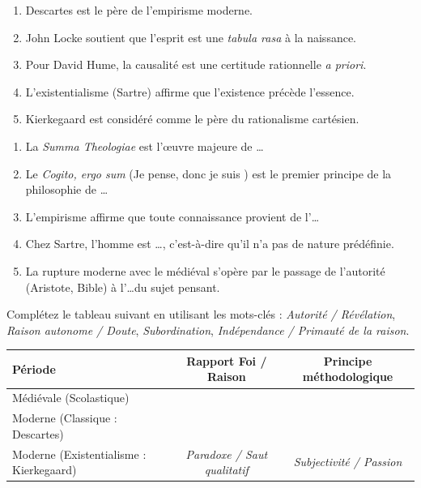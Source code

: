 \documentclass[11pt]{article}
\begin{document}
\begin{exercice}
\begin{enumerate}
    \item Descartes est le père de l'empirisme moderne.
    \item John Locke soutient que l'esprit est une \textit{tabula rasa} à la naissance.
    \item Pour David Hume, la causalité est une certitude rationnelle \textit{a priori}.
    \item L'existentialisme (Sartre) affirme que l'existence précède l'essence.
    \item Kierkegaard est considéré comme le père du rationalisme cartésien.
\end{enumerate}
\end{exercice}

\begin{exercice}
\begin{enumerate}
    \item La \textit{Summa Theologiae} est l'œuvre majeure de \dots
    \item Le \textit{Cogito, ergo sum} (\og Je pense, donc je suis \fg) est le premier principe de la philosophie de \dots
    \item L'empirisme affirme que toute connaissance provient de l'\dots
    \item Chez Sartre, l'homme est \dots, c'est-à-dire qu'il n'a pas de nature prédéfinie.
    \item La rupture moderne avec le médiéval s'opère par le passage de l'autorité (Aristote, Bible) à l'\dots du sujet pensant.
\end{enumerate}
\end{exercice}

\begin{exercice}
Complétez le tableau suivant en utilisant les mots-clés : \textit{Autorité / Révélation}, \textit{Raison autonome / Doute}, \textit{Subordination}, \textit{Indépendance / Primauté de la raison}.

\begin{tabularx}{\linewidth}{|X|c|c|}
\hline
\textbf{Période} & \textbf{Rapport Foi / Raison} & \textbf{Principe méthodologique} \\
\hline
Médiévale (Scolastique) & & \\
\hline
Moderne (Classique : Descartes) & & \\
\hline
Moderne (Existentialisme : Kierkegaard) & \textit{Paradoxe / Saut qualitatif} & \textit{Subjectivité / Passion} \\
\hline
\end{tabularx}
\end{exercice}
\end{document}
